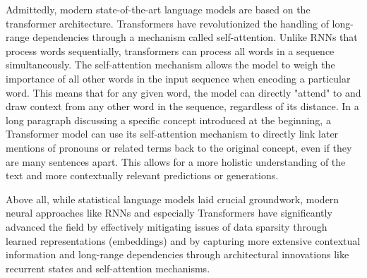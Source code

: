 Admittedly, modern state-of-the-art language models are based on the transformer architecture. Transformers have revolutionized the handling of long-range dependencies through a mechanism called self-attention. Unlike RNNs that process words sequentially, transformers can process all words in a sequence simultaneously. The self-attention mechanism allows the model to weigh the importance of all other words in the input sequence when encoding a particular word. This means that for any given word, the model can directly "attend" to and draw context from any other word in the sequence, regardless of its distance. In a long paragraph discussing a specific concept introduced at the beginning, a Transformer model can use its self-attention mechanism to directly link later mentions of pronouns or related terms back to the original concept, even if they are many sentences apart. This allows for a more holistic understanding of the text and more contextually relevant predictions or generations.

Above all, while statistical language models laid crucial groundwork, modern neural approaches like RNNs and especially Transformers have significantly advanced the field by effectively mitigating issues of data sparsity through learned representations (embeddings) and by capturing more extensive contextual information and long-range dependencies through architectural innovations like recurrent states and self-attention mechanisms.

